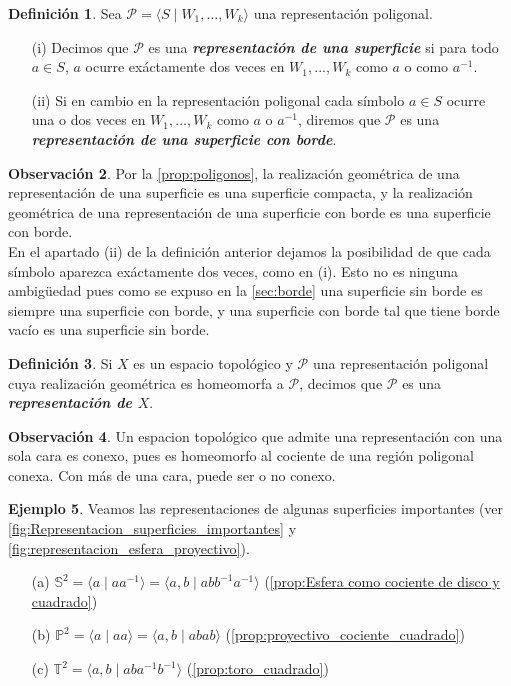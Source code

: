 \documentclass[10pt]{report}
\newcommand{\Toro}{\mathbb{T}^2}
\newcommand{\enfatiza}[1]{\textbf{\textit{#1}}}
\theoremstyle{definition}
\newtheorem{defin}{Definición}[section]
\newtheorem{obs}[defin]{Observación}
\newtheorem{eje}[defin]{Ejemplo}
\begin{document}
\begin{defin}%
Sea $\mathcal{P} =\langle S\mid W_1,\dots ,W_k\rangle$ una representación poligonal. 
\begin{itemize}
\item[(i)] Decimos que $\mathcal{P}$ es una \enfatiza{representación de una superficie} si para todo $a\in S$, $a$ ocurre exáctamente dos veces en $W_1,...,W_k$ como $a$ o como $a^{-1}$.
\item[(ii)] Si en cambio en la representación poligonal cada símbolo $a\in S$ ocurre una o dos veces en $W_1,\dots ,W_k$ como $a$ o $a^{-1}$, diremos que $\mathcal{P}$ es una \enfatiza{representación de una superficie con borde}. 
\end{itemize}
\end{defin}
\begin{obs}%
Por la \autoref{prop:poligonos}, la realización geométrica de una representación de una superficie es una superficie compacta, y la realización geométrica de una representación de una superficie con borde es una superficie con borde.\\
En el apartado (ii) de la definición anterior dejamos la posibilidad de que cada símbolo aparezca exáctamente dos veces, como en (i). Esto no es ninguna ambigüedad pues como se expuso en la \autoref{sec:borde} una superficie sin borde es siempre una superficie con borde, y una superficie con borde tal que tiene borde vacío es una superficie sin borde.
\end{obs}
\begin{defin}%
Si $X$ es un espacio topológico y $\mathcal{P}$ una representación poligonal cuya realización geométrica es homeomorfa a $\mathcal{P}$, decimos que $\mathcal{P}$ es una \textbf{\emph{representación de $X$}}.
\end{defin}
\begin{obs}%
Un espacion topológico que admite una representación con una sola cara es conexo, pues es homeomorfo al cociente de una región poligonal conexa. Con más de una cara, puede ser o no conexo.
\end{obs}

\begin{eje}\label{eje:rep_sup_importantes}%
Veamos las representaciones de algunas superficies importantes (ver \autoref{fig:Representacion_superficies_importantes} y \autoref{fig:representacion_esfera_proyectivo}).
\begin{itemize}
\item[(a)] $\mathbb{S}^2=\langle a\mid aa^{-1}\rangle=\langle a,b\mid  abb^{-1}a^{-1}\rangle$ (\autoref{prop:Esfera como cociente de disco y cuadrado})
\item[(b)] $\mathbb{P}^2= \langle a\mid aa \rangle = \langle a,b\mid abab \rangle$ (\autoref{prop:proyectivo_cociente_cuadrado})
\item[(c)] $\Toro=\langle a,b\mid aba^{-1}b^{-1}\rangle$ (\autoref{prop:toro_cuadrado})
\end{itemize}
\end{eje}
\end{document}
